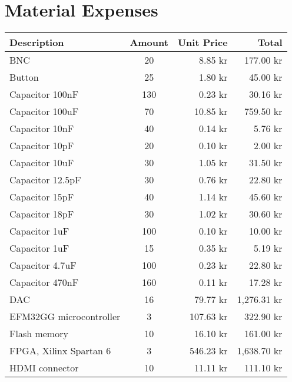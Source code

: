 \chapter{Material Expenses}
\label{tbl:material-cost}
\begin{longtable}{|l|c|r|r|}
    \hline
    \textbf{Description}    & \textbf{Amount} & \textbf{Unit Price} & \textbf{Total}       \\ \hline
    BNC                     & 20     & 8.85 kr    & 177.00 kr   \\ \hline
    Button                  & 25     & 1.80 kr    & 45.00 kr    \\ \hline
    Capacitor 100nF         & 130    & 0.23 kr    & 30.16 kr    \\ \hline
    Capacitor 100uF         & 70     & 10.85 kr   & 759.50 kr   \\ \hline
    Capacitor 10nF          & 40     & 0.14 kr    & 5.76 kr     \\ \hline
    Capacitor 10pF          & 20     & 0.10 kr    & 2.00 kr     \\ \hline
    Capacitor 10uF          & 30     & 1.05 kr    & 31.50 kr    \\ \hline
    Capacitor 12.5pF        & 30     & 0.76 kr    & 22.80 kr    \\ \hline
    Capacitor 15pF          & 40     & 1.14 kr    & 45.60 kr    \\ \hline
    Capacitor 18pF          & 30     & 1.02 kr    & 30.60 kr    \\ \hline
    Capacitor 1uF           & 100    & 0.10 kr    & 10.00 kr    \\ \hline
    Capacitor 1uF           & 15     & 0.35 kr    & 5.19 kr     \\ \hline
    Capacitor 4.7uF         & 100    & 0.23 kr    & 22.80 kr    \\ \hline
    Capacitor 470nF         & 160    & 0.11 kr    & 17.28 kr    \\ \hline
    DAC                     & 16     & 79.77 kr   & 1,276.31 kr \\ \hline
    EFM32GG microcontroller & 3      & 107.63 kr  & 322.90 kr   \\ \hline
    Flash memory            & 10     & 16.10 kr   & 161.00 kr   \\ \hline
    FPGA, Xilinx Spartan 6  & 3      & 546.23 kr  & 1,638.70 kr \\ \hline
    HDMI connector          & 10     & 11.11 kr   & 111.10 kr   \\ \hline

\end{longtable}
